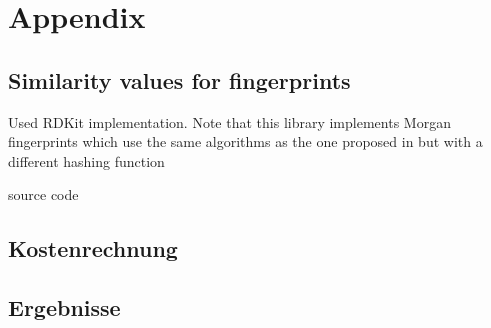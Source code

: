 \appendix
\section*{Appendix}

\subsection{Similarity values for fingerprints}
\label{ch:a_sim}
Used RDKit\citep{rdkit} implementation. Note that this library implements Morgan fingerprints which use the same algorithms as the one proposed in \citep{ECFP} but with a different hashing function

source code


\subsection{Kostenrechnung}
\label{ch:a_kosten}


\subsection{Ergebnisse}
\label{ch:a_erg}